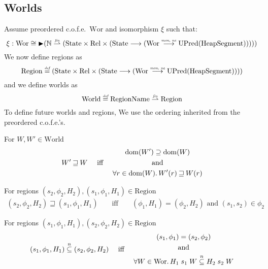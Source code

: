 \documentclass{article}
\newcommand{\finparfun}{\stackrel{\textit{\tiny{fin}}}{\rightharpoonup}}
\newcommand{\monnefun}{\stackrel{\textit{\tiny{mon, ne}}}{\longrightarrow}}
\newcommand{\fun}{\longrightarrow}
\newcommand{\defeq}{\stackrel{\textit{\tiny{def}}}{=}}
\newcommand{\nsubeq}[1][n]{\stackrel{\tiny{#1}}{\subseteq}}
\DeclareMathOperator{\dom}{dom}
\newcommand{\blater}{\mathop{\blacktriangleright}}
\newcommand{\cofe}{c.o.f.e.}
\newcommand{\cofes}{\cofe{}'s}
\newcommand{\future}{\mathbin{\sqsupseteq}}
\newcommand{\plaindom}[1]{\mathrm{#1}}
\newcommand{\HeapSegments}{\plaindom{HeapSegment}}
\newcommand{\nats}{\mathbb{N}}
\newcommand{\Rel}{\plaindom{Rel}}
\newcommand{\States}{\plaindom{State}}
\newcommand{\RegionNames}{\plaindom{RegionName}}
\newcommand{\Regions}{\plaindom{Region}}
\newcommand{\Worlds}{\plaindom{World}}
\newcommand{\Wor}{\plaindom{Wor}}
\newcommand{\UPred}[1]{\plaindom{UPred}(#1)}
\begin{document}
\subsection{Worlds}
Assume preordered \cofe{}\ $\Wor$ and isomorphism $\xi$ such that:
\[
  \xi : \Wor \cong \blater (\nats \finparfun (\States \times \Rel \times (\States \fun (\Wor \monnefun \UPred{\HeapSegments}))))
\]
We now define regions as
\[
\Regions \defeq (\States \times \Rel \times (\States \fun (\Wor \monnefun \UPred{\HeapSegments})))
\]
and we define worlds as
\[
\Worlds \defeq \RegionNames \finparfun \Regions
\]
To define future worlds and regions, We use the ordering inherited from the preordered \cofes{}.
\begin{definition}
  For $W, W' \in \Worlds$
 \begin{align*}
 W' \future W & & \text{ iff } & &
   \begin{gathered}
     \dom(W') \supseteq \dom(W)\\ 
     \text{ and } \\
     \forall r \in \dom(W) \ldotp W'(r) \future W(r)
   \end{gathered}
 \end{align*}
\end{definition}

\begin{definition}
For regions $(s_2,\phi_2,H_2), (s_1,\phi_1,H_1) \in \Regions$
  \begin{align*}
 (s_2,\phi_2,H_2) \future (s_1,\phi_1,H_1) &&\text{ iff } & &
(\phi_1,H_1) = (\phi_2,H_2) \text{ and } (s_1,s_2) \in \phi_2
  \end{align*}
\end{definition}

\begin{definition}
For regions $(s_1,\phi_1,H_1), (s_2,\phi_2,H_2) \in \Regions$
\begin{align*}
  (s_1,\phi_1,H_1) \nsubeq (s_2,\phi_2,H_2) & & \text{ iff } & &
  \begin{gathered}
    (s_1,\phi_1) = (s_2,\phi_2)\\
    \text{ and }\\
    \forall W \in \Wor \ldotp H_1 \; s_1 \; W \nsubeq H_2 \; s_2 \; W
  \end{gathered}
\end{align*}
\end{definition}
\end{document}
